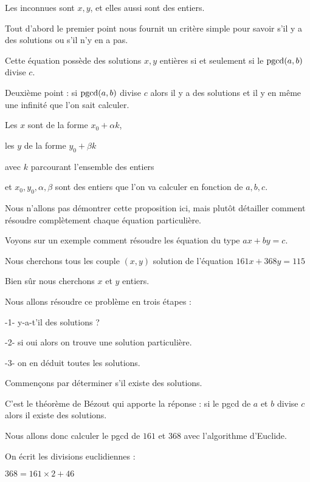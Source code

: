 Les inconnues sont $x,y$, et elles aussi sont des entiers.

\change

Tout d'abord le premier point nous fournit un critère simple pour savoir s'il y a des solutions
 ou s'il n'y en a pas.

Cette équation possède des solutions $x,y$ entières si et seulement si
le $\mathop{\mathrm{pgcd}}\nolimits(a,b)$ divise $c$.

\change

Deuxième point : si $\mathop{\mathrm{pgcd}}\nolimits(a,b)$ divise $c$ alors il y a des solutions et il y en même une infinité
que l'on sait calculer. 

Les $x$ sont de la forme $x_0+\alpha k$,

les  $y$ de la forme $y_0+\beta k$ 

avec $k$ parcourant l'ensemble des entiers 

et  $x_0,y_0,\alpha,\beta$ sont des entiers que l'on va calculer en fonction de $a,b,c$.


Nous n'allons pas démontrer cette proposition ici, mais plutôt détailler
comment résoudre complètement chaque équation particulière.

\diapo


Voyons sur un exemple comment résoudre les équation du type 
$ax+by=c$.

Nous cherchons tous les couple $(x,y)$ solution de l'équation $161 x + 368 y=115$

Bien sûr nous cherchons $x$ et $y$ entiers. 

Nous allons résoudre ce problème en trois étapes :

  -1- y-a-t'il des solutions ?

  -2- si oui alors on trouve une solution particulière.

  -3- on en déduit toutes les solutions.
  

\change

Commençons par déterminer s'il existe des solutions.

\change

C'est le théorème de Bézout qui apporte la réponse :
si le pgcd de $a$ et $b$ divise $c$ alors il existe des solutions.

Nous allons donc calculer le pgcd de $161$ et $368$ avec l'algorithme d'Euclide.

\change

On écrit les divisions euclidiennes :
 
$368  =  161  \times  2  +  46$

